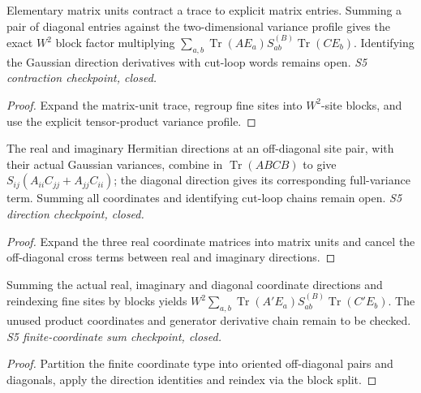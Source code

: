 \begin{lemma}
  \label{lem:loop-contraction-basic}
  \leanok
  Elementary matrix units contract a trace to explicit matrix entries.
  Summing a pair of diagonal entries against the two-dimensional variance
  profile gives the exact $W^2$ block factor multiplying
  $\sum_{a,b}\operatorname{Tr}(AE_a)S^{(B)}_{ab}\operatorname{Tr}(CE_b)$.
  Identifying the Gaussian direction derivatives with cut-loop words remains
  open. \emph{S5 contraction checkpoint, closed.}
\end{lemma}
\begin{proof}\leanok
  Expand the matrix-unit trace, regroup fine sites into $W^2$-site blocks,
  and use the explicit tensor-product variance profile.
\end{proof}

\begin{lemma}
  \label{lem:loop-contraction-directions}
  \leanok
  The real and imaginary Hermitian directions at an off-diagonal site pair,
  with their actual Gaussian variances, combine in
  $\operatorname{Tr}(ABCB)$ to give
  $S_{ij}(A_{ii}C_{jj}+A_{jj}C_{ii})$; the diagonal direction gives its
  corresponding full-variance term. Summing all coordinates and identifying
  cut-loop chains remain open. \emph{S5 direction checkpoint, closed.}
\end{lemma}
\begin{proof}\leanok
  Expand the three real coordinate matrices into matrix units and cancel
  the off-diagonal cross terms between real and imaginary directions.
\end{proof}

\begin{lemma}
  \label{lem:loop-contraction-sum}
  \leanok
  Summing the actual real, imaginary and diagonal coordinate directions and
  reindexing fine sites by blocks yields
  $W^2\sum_{a,b}\operatorname{Tr}(A'E_a)S^{(B)}_{ab}
  \operatorname{Tr}(C'E_b)$.
  The unused product coordinates and generator derivative chain remain to be
  checked. \emph{S5 finite-coordinate sum checkpoint, closed.}
\end{lemma}
\begin{proof}\leanok
  Partition the finite coordinate type into oriented off-diagonal pairs and
  diagonals, apply the direction identities and reindex via the block split.
\end{proof}

